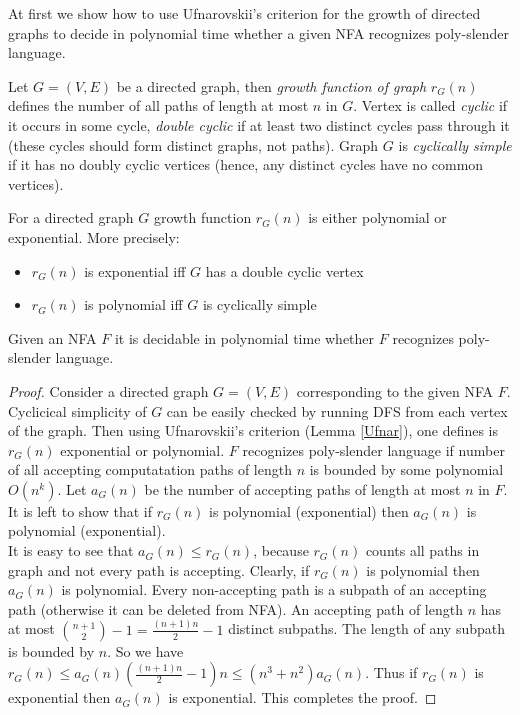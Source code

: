 At first we show how to use Ufnarovskii's criterion for the growth of directed graphs \cite{Ufnarovskii} to decide in polynomial time whether a given NFA recognizes poly-slender language. 


Let $G = (V,  E)$ be a directed graph, then \textit{growth function of graph} $r_G(n)$ defines the number of all paths of length at most $n$ in $G$. Vertex is called \textit{cyclic} if it occurs in some cycle, \textit{double cyclic} if at least two distinct cycles pass through it (these cycles should form distinct graphs, not paths). Graph $G$ is \textit{cyclically simple} if it has no doubly cyclic vertices (hence, any distinct cycles have no common vertices).
\begin{lemma}
\label{Ufnar}
For a directed graph $G$ growth function $r_G(n)$ is either polynomial or exponential. More precisely:
\begin{itemize}
\item $r_G(n)$ is exponential iff $G$ has a double cyclic vertex
\item $r_G(n)$ is polynomial iff $G$ is cyclically simple
\end{itemize}
\end{lemma}
\begin{theorem}
\label{lemconstr}
Given an NFA $F$ it is decidable in polynomial time whether $F$ recognizes poly-slender language.
\end{theorem}
\begin{proof}
Consider a directed graph $G = (V, E)$ corresponding to the given NFA $F$. Cyclicical simplicity of $G$ can be easily checked by running DFS from each vertex of the graph. Then using Ufnarovskii's criterion (Lemma \ref{Ufnar}), one defines is $r_G(n)$ exponential or polynomial. $F$ recognizes poly-slender language if number of all accepting computatation paths of length $n$ is bounded by some polynomial $O(n^k)$. Let $a_G(n)$ be the number of accepting paths of length at most $n$ in $F$. It is left to show that if $r_G(n)$ is polynomial (exponential) then $a_G(n)$ is polynomial (exponential).
\\
It is easy to see that $a_G(n) \le r_G(n)$, because $r_G(n)$ counts all paths in graph and not every path is accepting. Clearly, if $r_G(n)$ is polynomial then $a_G(n)$ is polynomial. 
Every non-accepting path is a subpath of an accepting path (otherwise it can be deleted from NFA). An accepting path of length $n$ has at most $\binom{n+1}{2} -1 = \frac{(n+1)n}{2} -1$ distinct subpaths. The length of any subpath is bounded by $n$. So we have $r_G(n) \le a_G(n) (\frac{(n+1)n}{2} -1) n \le (n^3 + n^2) a_G(n)$.
Thus if $r_G(n)$ is exponential then $a_G(n)$ is exponential. This completes the proof.
\end{proof}

